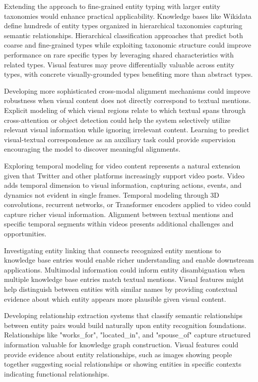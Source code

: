 \documentclass[12pt,a4paper]{report}
\begin{document}
Extending the approach to fine-grained entity typing with larger entity taxonomies would enhance practical applicability. Knowledge bases like Wikidata define hundreds of entity types organized in hierarchical taxonomies capturing semantic relationships. Hierarchical classification approaches that predict both coarse and fine-grained types while exploiting taxonomic structure could improve performance on rare specific types by leveraging shared characteristics with related types. Visual features may prove differentially valuable across entity types, with concrete visually-grounded types benefiting more than abstract types.

Developing more sophisticated cross-modal alignment mechanisms could improve robustness when visual content does not directly correspond to textual mentions. Explicit modeling of which visual regions relate to which textual spans through cross-attention or object detection could help the system selectively utilize relevant visual information while ignoring irrelevant content. Learning to predict visual-textual correspondence as an auxiliary task could provide supervision encouraging the model to discover meaningful alignments.

Exploring temporal modeling for video content represents a natural extension given that Twitter and other platforms increasingly support video posts. Video adds temporal dimension to visual information, capturing actions, events, and dynamics not evident in single frames. Temporal modeling through 3D convolutions, recurrent networks, or Transformer encoders applied to video could capture richer visual information. Alignment between textual mentions and specific temporal segments within videos presents additional challenges and opportunities.

Investigating entity linking that connects recognized entity mentions to knowledge base entries would enable richer understanding and enable downstream applications. Multimodal information could inform entity disambiguation when multiple knowledge base entries match textual mentions. Visual features might help distinguish between entities with similar names by providing contextual evidence about which entity appears more plausible given visual content.

Developing relationship extraction systems that classify semantic relationships between entity pairs would build naturally upon entity recognition foundations. Relationships like "works_for", "located_in", and "spouse_of" capture structured information valuable for knowledge graph construction. Visual features could provide evidence about entity relationships, such as images showing people together suggesting social relationships or showing entities in specific contexts indicating functional relationships.
\end{document}
